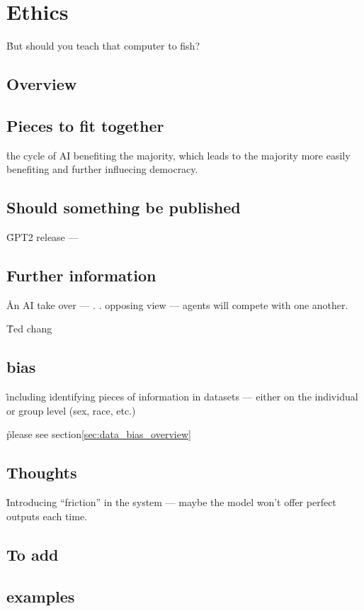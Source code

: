\chapter{Ethics}




\r{But should you teach that computer to fish?}

\section{Overview}


\section{Pieces to fit together}


\r{the cycle of AI benefiting the majority, which leads to the majority more easily benefiting and further influecing democracy.}

\section{Should something be published}


\r{GPT2 release --- }


\section{Further information}

\r{An AI take over --- . . opposing view --- agents will compete with one another.}

\r{Ted chang}

\section{bias}

\r{including identifying pieces of information in datasets --- either on the individual or group level (sex, race, etc.)}

\r{please see section\ref{sec:data_bias_overview}}


\section{Thoughts}

\r{Introducing ``friction'' in the system --- maybe the model won't offer perfect outputs each time.}

\section{To add}


\section{examples}

